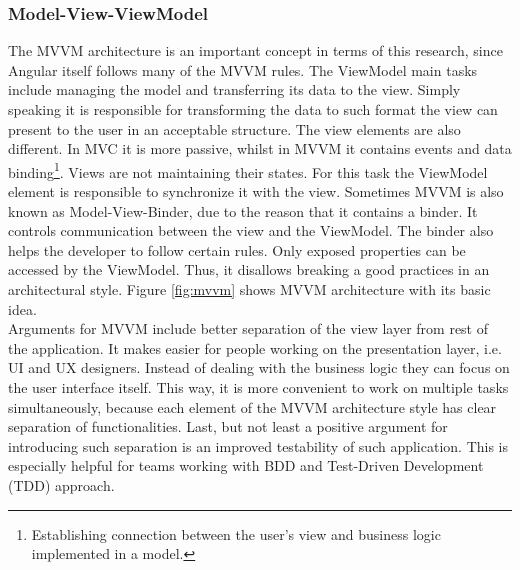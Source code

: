 \documentclass{article} %
\begin{document}
\subsubsection{Model-View-ViewModel}
The MVVM architecture is an important concept in terms of this research, since Angular itself follows many of the MVVM rules. The ViewModel main tasks include managing the model and transferring its data to the view. Simply speaking it is responsible for transforming the data to such format the view can present to the user in an acceptable structure. The view elements are also different. In MVC it is more passive, whilst in MVVM it contains events and data binding\footnote{Establishing connection between the user's view and business logic implemented in a model.}. Views are not maintaining their states. For this task the ViewModel element is responsible to synchronize it with the view. Sometimes MVVM is also known as Model-View-Binder, due to the reason that it contains a binder. It controls communication between the view and the ViewModel. The binder also helps the developer to follow certain rules. Only exposed properties can be accessed by the ViewModel. Thus, it disallows breaking a good practices in an architectural style. Figure \ref{fig:mvvm} shows MVVM architecture with its basic idea.\\
\newline
Arguments for MVVM include better separation of the view layer from rest of the application. It makes easier for people working on the presentation layer, i.e. UI and UX designers. Instead of dealing with the business logic they can focus on the user interface itself. This way, it is more convenient to work on multiple tasks simultaneously, because each element of the MVVM architecture style has clear separation of functionalities. Last, but not least a positive argument for introducing such separation is an improved testability of such application. This is especially helpful for teams working with BDD and Test-Driven Development (TDD) approach.\\
\end{document}
